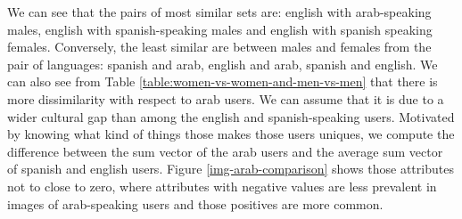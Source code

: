 \documentclass[runningheads]{llncs}
\begin{document}
We can see
that the pairs of most similar sets are: english with arab-speaking males, english with spanish-speaking males
and  english with spanish speaking females. Conversely, 
the least similar are between males and females
from the pair of languages: spanish and arab, english and arab, spanish and english. 
We can also see from Table \ref{table:women-vs-women-and-men-vs-men} that there is more dissimilarity with respect to arab users. We can assume that it is due to a wider cultural gap than among the english and spanish-speaking users. Motivated by knowing what kind of things those
makes those users uniques, we compute the difference between the
sum vector of the arab users and the average sum vector of spanish and
english users. Figure  \ref{img-arab-comparison} shows those attributes
not to close to zero, where attributes with negative values are less 
prevalent in images of arab-speaking users and those positives are
more common.
\end{document}
